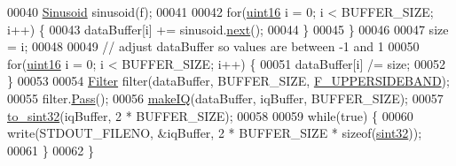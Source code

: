 \begin{DoxyCode}
00040         \hyperlink{classradio_1_1Sinusoid}{Sinusoid} sinusoid(f);
00041 
00042         \textcolor{keywordflow}{for}(\hyperlink{definitions_8hpp_a05f6b0ae8f6a6e135b0e290c25fe0e4e}{uint16} i = 0; i < BUFFER\_SIZE; i++) \{
00043             dataBuffer[i] += sinusoid.\hyperlink{classradio_1_1Sinusoid_aab44298ea1bd5cb175d5826243cf56f2}{next}();
00044         \}
00045     \}
00046 
00047     size = i;
00048     
00049     \textcolor{comment}{// adjust dataBuffer so values are between -1 and 1}
00050     \textcolor{keywordflow}{for}(\hyperlink{definitions_8hpp_a05f6b0ae8f6a6e135b0e290c25fe0e4e}{uint16} i = 0; i < BUFFER\_SIZE; i++) \{
00051         dataBuffer[i] /= size;
00052     \}
00053     
00054     \hyperlink{classradio_1_1Filter}{Filter} filter(dataBuffer, BUFFER\_SIZE, \hyperlink{namespaceradio_a0ec4548711b6d6ed6867c70b3fc2a413}{F\_UPPERSIDEBAND});
00055     filter.\hyperlink{classradio_1_1Filter_ad2793821801780809af385463bf8f197}{Pass}();
00056     \hyperlink{namespaceradio_a7166522e76ff88e8d482491b1b6e2275}{makeIQ}(dataBuffer, iqBuffer, BUFFER\_SIZE);
00057     \hyperlink{namespaceradio_ae4b2334c4366dcdf0311ad79d2067945}{to\_sint32}(iqBuffer, 2 * BUFFER\_SIZE);
00058 
00059     \textcolor{keywordflow}{while}(\textcolor{keyword}{true}) \{
00060         write(STDOUT\_FILENO, &iqBuffer, 2 * BUFFER\_SIZE * \textcolor{keyword}{sizeof}(\hyperlink{definitions_8hpp_a0573de65958b4fda3a0460ed417dafb8}{sint32}));
00061     \}
00062 \}
\end{DoxyCode}
